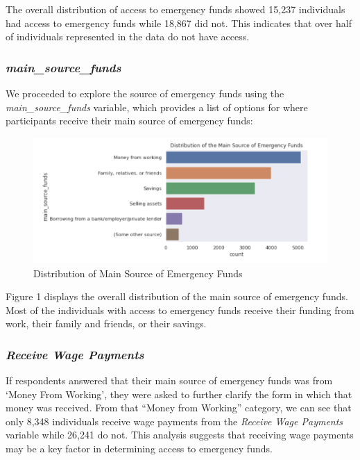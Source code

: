 \documentclass[water,article,submit,moreauthors,pdftex]{mdpi}
\begin{document}
The overall distribution of access to emergency funds showed 15,237
individuals had access to emergency funds while 18,867 did not. This
indicates that over half of individuals represented in the data do not
have access.

\hypertarget{main_source_funds}{%
\subsubsection{\texorpdfstring{\emph{main\_source\_funds}}{main\_source\_funds}}\label{main_source_funds}}

We proceeded to explore the source of emergency funds using the
\emph{main\_source\_funds} variable, which provides a list of options
for where participants receive their main source of emergency funds:

\begin{figure}
\centering
\includegraphics[width=\textwidth,height=0.5\textheight]{images/MainSourceFunds.png}
\caption{Distribution of Main Source of Emergency Funds}
\end{figure}

Figure 1 displays the overall distribution of the main source of
emergency funds. Most of the individuals with access to emergency funds
receive their funding from work, their family and friends, or their
savings.

\hypertarget{receive-wage-payments}{%
\subsubsection{\texorpdfstring{\emph{Receive Wage
Payments}}{Receive Wage Payments}}\label{receive-wage-payments}}

If respondents answered that their main source of emergency funds was
from `Money From Working', they were asked to further clarify the form
in which that money was received. From that ``Money from Working''
category, we can see that only 8,348 individuals receive wage payments
from the \emph{Receive Wage Payments} variable while 26,241 do not. This
analysis suggests that receiving wage payments may be a key factor in
determining access to emergency funds.
\end{document}
